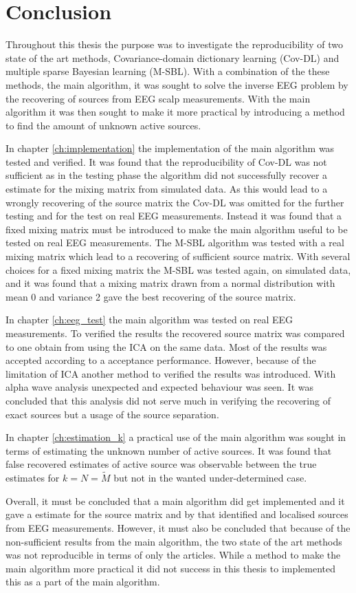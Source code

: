 \chapter{Conclusion}
Throughout this thesis the purpose was to investigate the reproducibility of two state of the art methods, Covariance-domain dictionary learning (Cov-DL) and multiple sparse Bayesian learning (M-SBL). 
With a combination of the these methods, the main algorithm, it was sought to solve the inverse EEG problem by the recovering of sources from EEG scalp measurements. 
With the main algorithm it was then sought to make it more practical by introducing a method to find the amount of unknown active sources. 

In chapter \ref{ch:implementation} the implementation of the main algorithm was tested and verified. 
It was found that the reproducibility of Cov-DL was not sufficient  as in the testing phase the algorithm did not successfully recover a estimate for the mixing matrix from simulated data. 
As this would lead to a wrongly recovering of the source matrix the Cov-DL was omitted for the further testing and for the test on real EEG measurements.
Instead it was found that a fixed mixing matrix must be introduced to make the main algorithm useful to be tested on real EEG measurements.
The M-SBL algorithm was tested with a real mixing matrix which lead to a recovering of sufficient source matrix.
With several choices for a fixed mixing matrix the M-SBL was tested again, on simulated data, and it was found that a mixing matrix drawn from a normal distribution with mean 0 and variance 2 gave the best recovering of the source matrix.

In chapter \ref{ch:eeg_test} the main algorithm was tested on real EEG measurements. To verified the results the recovered source matrix was compared to one obtain from using the ICA on the same data. Most of the results was accepted according to a acceptance performance. However, because of the limitation of ICA another method to verified the results was introduced.
With alpha wave analysis unexpected and expected behaviour was seen. It was concluded that this analysis did not serve much in verifying the recovering of exact sources but a usage of the source separation.

In chapter \ref{ch:estimation_k} a practical use of the main algorithm was sought in terms of estimating the unknown number of active sources. It was found that false recovered estimates of active source was observable between the true estimates for $k = N = \tilde{M}$ but not in the wanted under-determined case.

Overall, it must be concluded that a main algorithm did get implemented and it gave a estimate for the source matrix and by that identified and localised sources from EEG measurements. However, it must also be concluded that because of the non-sufficient results from the main algorithm, the two state of the art methods was not reproducible in terms of only the articles. While a method to make the main algorithm more practical it did not success in this thesis to implemented this as a part of the main algorithm.
